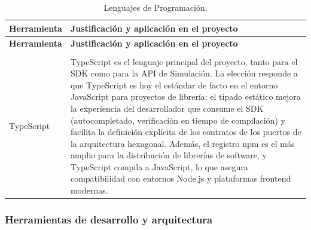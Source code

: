 \begin{center}
\renewcommand{\arraystretch}{1.2}
\begin{longtable}{|P{0.5}|P{0.5}|}
  \hline
  \textbf{Herramienta} & \textbf{Justificación y aplicación en el proyecto} \\
  \hline
  \endfirsthead
  \hline
  \textbf{Herramienta} & \textbf{Justificación y aplicación en el proyecto} \\
  \hline
  \endhead
  \caption{Lenguajes de Programación.}
  \label{tab:lenguajes-programacion}\\
  \endlastfoot
  TypeScript & TypeScript es el lenguaje principal del proyecto, tanto para el SDK como para la API de Simulación. La elección responde a que TypeScript es hoy el estándar de facto en el entorno JavaScript para proyectos de librería: el tipado estático mejora la experiencia del desarrollador que consume el SDK (autocompletado, verificación en tiempo de compilación) y facilita la definición explícita de los contratos de los puertos de la arquitectura hexagonal. Además, el registro npm es el más amplio para la distribución de librerías de software, y TypeScript compila a JavaScript, lo que asegura compatibilidad con entornos Node.js y plataformas frontend modernas. \\
  \hline
\end{longtable}
\end{center}

\subsubsection{Herramientas de desarrollo y arquitectura}

